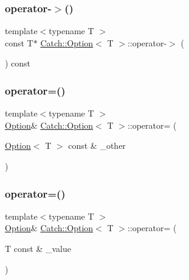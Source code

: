 \mbox{\label{class_catch_1_1_option_ae8343cbc36dbb95b2dce333d2a6fdc28}} 
\subsubsection{\texorpdfstring{operator-\/$>$()}{operator->()}\hspace{0.1cm}{\footnotesize\ttfamily [2/2]}}
{\footnotesize\ttfamily template$<$typename T $>$ \\
const T$\ast$ \mbox{\hyperlink{class_catch_1_1_option}{Catch\+::\+Option}}$<$ T $>$\+::operator-\/$>$ (\begin{DoxyParamCaption}{ }\end{DoxyParamCaption}) const\hspace{0.3cm}{\ttfamily [inline]}}

\mbox{\label{class_catch_1_1_option_a78c65b15dd6b2fbd04c5012c43017c8f}} 
\subsubsection{\texorpdfstring{operator=()}{operator=()}\hspace{0.1cm}{\footnotesize\ttfamily [1/2]}}
{\footnotesize\ttfamily template$<$typename T $>$ \\
\mbox{\hyperlink{class_catch_1_1_option}{Option}}\& \mbox{\hyperlink{class_catch_1_1_option}{Catch\+::\+Option}}$<$ T $>$\+::operator= (\begin{DoxyParamCaption}\item[{\mbox{\hyperlink{class_catch_1_1_option}{Option}}$<$ T $>$ const \&}]{\+\_\+other }\end{DoxyParamCaption})\hspace{0.3cm}{\ttfamily [inline]}}

\mbox{\label{class_catch_1_1_option_a2be7e343ab22d6061726d32ab4622653}} 
\subsubsection{\texorpdfstring{operator=()}{operator=()}\hspace{0.1cm}{\footnotesize\ttfamily [2/2]}}
{\footnotesize\ttfamily template$<$typename T $>$ \\
\mbox{\hyperlink{class_catch_1_1_option}{Option}}\& \mbox{\hyperlink{class_catch_1_1_option}{Catch\+::\+Option}}$<$ T $>$\+::operator= (\begin{DoxyParamCaption}\item[{T const \&}]{\+\_\+value }\end{DoxyParamCaption})\hspace{0.3cm}{\ttfamily [inline]}}

